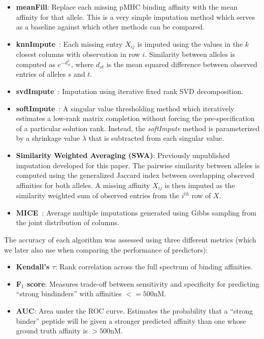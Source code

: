 \begin{itemize}
\item {\bf meanFill}: Replace each missing pMHC binding affinity with the mean affinity for that allele. This is a very simple imputation method which serves as a baseline against which other methods can be compared. 

\item {\bf knnImpute}~\cite{Troyanskaya2001MissingMicroarrays}: Each missing entry $X_{ij}$ is imputed using the values in the $k$ closest columns with observation in row $i$.  Similarity between alleles is computed as $e^{-d_{st}^2}$, where $d_{st}$ is the mean squared difference between observed entries of alleles $s$ and $t$. 

\item {\bf svdImpute}~\cite{Troyanskaya2001MissingMicroarrays}: Imputation using iterative fixed rank SVD decomposition. 

\item {\bf softImpute}~\cite{Mazumder2010SpectralMatrices}: A singular value thresholding method which iteratively estimates a low-rank matrix completion without forcing the pre-specification of a particular solution rank. Instead, the {\it softImpute} method is parameterized by a shrinkage value $\lambda$ that is subtracted from each singular value. 

\item {\bf Similarity Weighted Averaging (SWA)}: Previously unpublished imputation developed for this paper. The pairwise similarity between alleles is computed using the generalized Jaccard index between overlapping observed affinities for both alleles. A missing affinity $X_{ij}$ is then imputed as the similarity weighted sum of observed entries from the $i^{th}$ row of $X$. 

\item {\bf MICE}~\cite{Azur2011MultipleWork}: Average multiple imputations generated using Gibbs sampling from the joint distribution of columns. 
\end{itemize}

The accuracy of each algorithm was assessed using three different metrics (which we later also use when comparing the performance of predictors):

\begin{itemize}
\item {\bf Kendall's $\tau$}: Rank correlation across the full spectrum of binding affinities.
\item {\bf F$_1$ score}: Measures trade-off between sensitivity and specificity for predicting ``strong bindinders'' with affinities $<= 500$nM. 
\item {\bf AUC}: Area under the ROC curve. Estimates the probability that a ``strong binder'' peptide will be given a stronger predicted affinity than one whose ground truth affinity is $>500$nM. 
\end{itemize}


